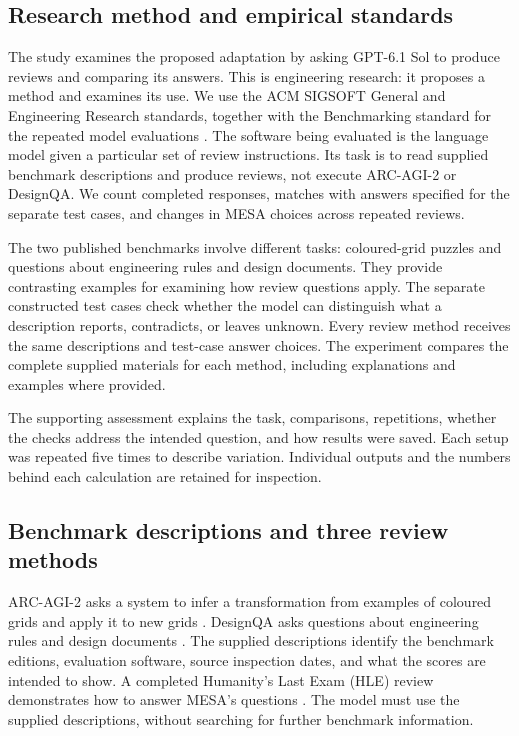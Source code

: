 \documentclass[10pt,conference]{IEEEtran}
\begin{document}
\subsection{Research method and empirical standards}
The study examines the proposed adaptation by asking GPT-6.1 Sol to produce reviews and comparing its answers. This is engineering research: it proposes a method and examines its use. We use the ACM SIGSOFT General and Engineering Research standards, together with the Benchmarking standard for the repeated model evaluations \cite{sigsoft_empirical_standards}. The software being evaluated is the language model given a particular set of review instructions. Its task is to read supplied benchmark descriptions and produce reviews, not execute ARC-AGI-2 or DesignQA. We count completed responses, matches with answers specified for the separate test cases, and changes in MESA choices across repeated reviews.

The two published benchmarks involve different tasks: coloured-grid puzzles and questions about engineering rules and design documents. They provide contrasting examples for examining how review questions apply. The separate constructed test cases check whether the model can distinguish what a description reports, contradicts, or leaves unknown. Every review method receives the same descriptions and test-case answer choices. The experiment compares the complete supplied materials for each method, including explanations and examples where provided.

The supporting assessment explains the task, comparisons, repetitions, whether the checks address the intended question, and how results were saved. Each setup was repeated five times to describe variation. Individual outputs and the numbers behind each calculation are retained for inspection.

\subsection{Benchmark descriptions and three review methods}
ARC-AGI-2 asks a system to infer a transformation from examples of coloured grids and apply it to new grids \cite{chollet_arc_agi_2_2025}. DesignQA asks questions about engineering rules and design documents \cite{doris_designqa_2024}. The supplied descriptions identify the benchmark editions, evaluation software, source inspection dates, and what the scores are intended to show. A completed Humanity's Last Exam (HLE) review demonstrates how to answer MESA's questions \cite{phan_etal_hle_2025}. The model must use the supplied descriptions, without searching for further benchmark information.
\end{document}
